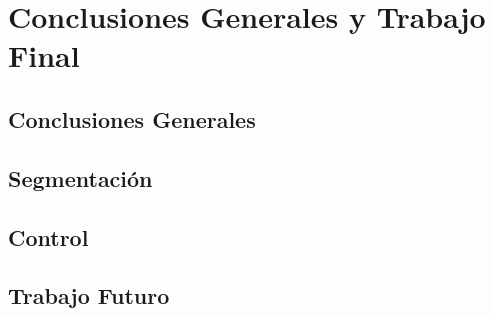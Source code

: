 \chapter{Conclusiones Generales y Trabajo Final}


\section{Conclusiones Generales}

\section{Segmentación}

\section{Control}

\section{Trabajo Futuro}
